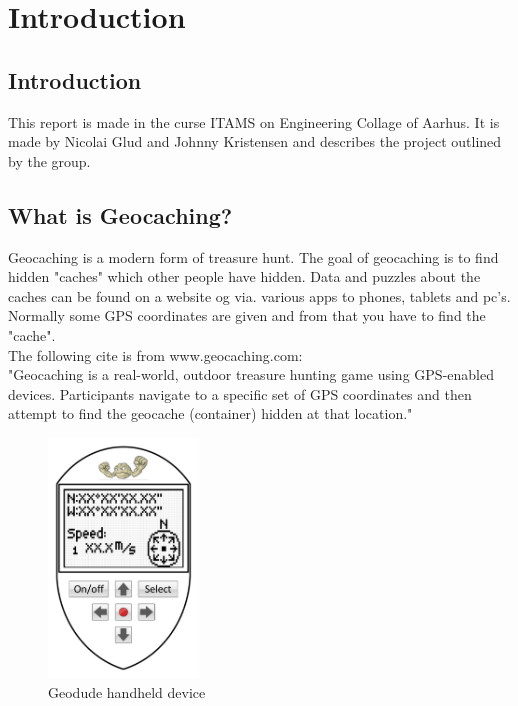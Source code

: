\chapter{Introduction}


\section{Introduction}
This report is made in the curse ITAMS on Engineering Collage of Aarhus. It is made by Nicolai Glud and Johnny Kristensen and describes the project outlined by the group.

\section{What is Geocaching?}
Geocaching is a modern form of treasure hunt. The goal of geocaching is to find hidden "caches" which other people have hidden. Data and puzzles about the caches can be found on a website og via. various apps to phones, tablets and pc's. Normally some GPS coordinates are given and from that you have to find the "cache".\\
The following cite is from www.geocaching.com:\\
"Geocaching is a real-world, outdoor treasure hunting game using GPS-enabled devices. Participants navigate to a specific set of GPS coordinates and then attempt to find the geocache (container) hidden at that location."

\begin{figure}
\vspace{-30pt}
\begin{center}
\includegraphics[width=4cm]{billeder/geodude}
\end{center}
\vspace{-20pt}
\caption{Geodude handheld device}
\vspace{-20pt}
\end{figure}


